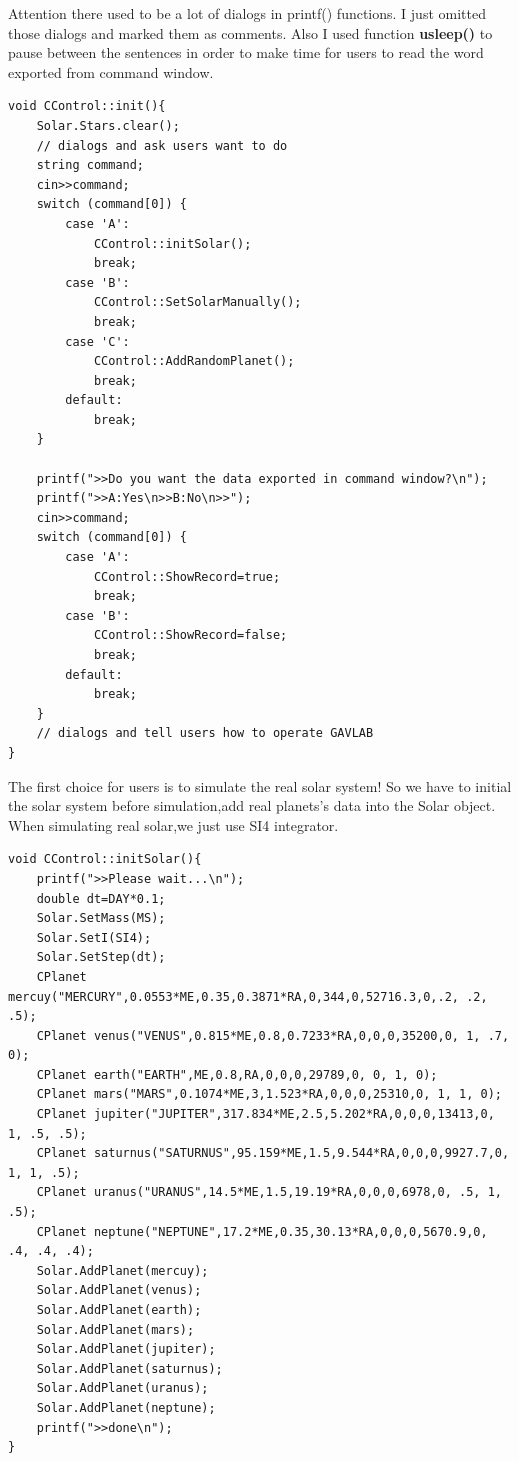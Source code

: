\documentclass[12pt]{article}
\begin{document}
Attention there used to be a lot of dialogs in printf() functions.
I just omitted those dialogs and marked them as comments.
Also I used function \textbf{usleep()} to pause between the sentences in order to
make time for users to read the word exported from command window.
\clearpage
\begin{lstlisting}[caption=init()]
void CControl::init(){
    Solar.Stars.clear();
    // dialogs and ask users want to do
    string command;
    cin>>command;
    switch (command[0]) {
        case 'A':
            CControl::initSolar();
            break;
        case 'B':
            CControl::SetSolarManually();
            break;
        case 'C':
            CControl::AddRandomPlanet();
            break;
        default:
            break;
    }
    
    printf(">>Do you want the data exported in command window?\n");
    printf(">>A:Yes\n>>B:No\n>>");
    cin>>command;
    switch (command[0]) {
        case 'A':
            CControl::ShowRecord=true;
            break;
        case 'B':
            CControl::ShowRecord=false;
            break;
        default:
            break;
    }
    // dialogs and tell users how to operate GAVLAB
}
\end{lstlisting}
\clearpage

The first choice for users is to simulate the real solar system!
So we have to initial the solar system before simulation,add real planets's data into the Solar object.
When simulating real solar,we just use SI4 integrator.
\begin{lstlisting}[caption=initSolar()]
void CControl::initSolar(){
    printf(">>Please wait...\n");
    double dt=DAY*0.1;
    Solar.SetMass(MS);
    Solar.SetI(SI4);
    Solar.SetStep(dt);
    CPlanet mercuy("MERCURY",0.0553*ME,0.35,0.3871*RA,0,344,0,52716.3,0,.2, .2, .5);
    CPlanet venus("VENUS",0.815*ME,0.8,0.7233*RA,0,0,0,35200,0, 1, .7, 0);
    CPlanet earth("EARTH",ME,0.8,RA,0,0,0,29789,0, 0, 1, 0);
    CPlanet mars("MARS",0.1074*ME,3,1.523*RA,0,0,0,25310,0, 1, 1, 0);
    CPlanet jupiter("JUPITER",317.834*ME,2.5,5.202*RA,0,0,0,13413,0, 1, .5, .5);
    CPlanet saturnus("SATURNUS",95.159*ME,1.5,9.544*RA,0,0,0,9927.7,0, 1, 1, .5);
    CPlanet uranus("URANUS",14.5*ME,1.5,19.19*RA,0,0,0,6978,0, .5, 1, .5);
    CPlanet neptune("NEPTUNE",17.2*ME,0.35,30.13*RA,0,0,0,5670.9,0, .4, .4, .4);
    Solar.AddPlanet(mercuy);
    Solar.AddPlanet(venus);
    Solar.AddPlanet(earth);
    Solar.AddPlanet(mars);
    Solar.AddPlanet(jupiter);
    Solar.AddPlanet(saturnus);
    Solar.AddPlanet(uranus);
    Solar.AddPlanet(neptune);
    printf(">>done\n");
}
\end{lstlisting}
\clearpage
\end{document}
